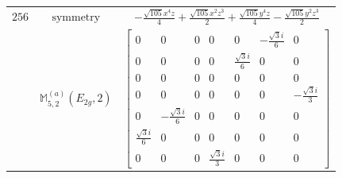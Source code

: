 \documentclass[fleqn,8pt,landscape]{jsarticle}
\begin{document}
\begin{longtable}{ccc}
$ 256 $ & $ \text{symmetry} $ & $ - \frac{\sqrt{105} x^{4} z}{4} + \frac{\sqrt{105} x^{2} z^{3}}{2} + \frac{\sqrt{105} y^{4} z}{4} - \frac{\sqrt{105} y^{2} z^{3}}{2} $ \\
$  $ & $ \mathbb{M}_{5,2}^{(a)}(E_{2g},2) $ & $ \begin{bmatrix} 0 & 0 & 0 & 0 & 0 & - \frac{\sqrt{3} i}{6} & 0 \\ 0 & 0 & 0 & 0 & \frac{\sqrt{3} i}{6} & 0 & 0 \\ 0 & 0 & 0 & 0 & 0 & 0 & 0 \\ 0 & 0 & 0 & 0 & 0 & 0 & - \frac{\sqrt{3} i}{3} \\ 0 & - \frac{\sqrt{3} i}{6} & 0 & 0 & 0 & 0 & 0 \\ \frac{\sqrt{3} i}{6} & 0 & 0 & 0 & 0 & 0 & 0 \\ 0 & 0 & 0 & \frac{\sqrt{3} i}{3} & 0 & 0 & 0 \end{bmatrix} $ \\ \hline
\end{longtable}
\end{document}
